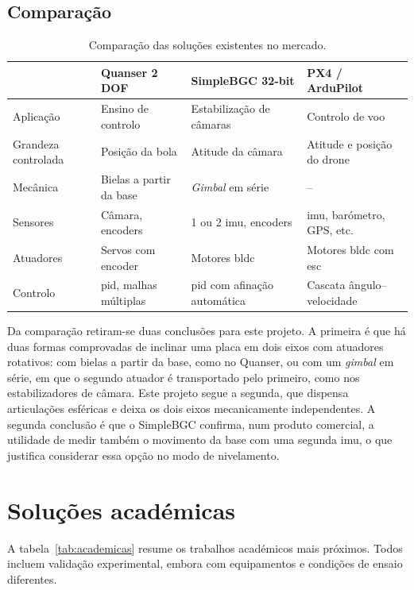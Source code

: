 \subsection{Comparação}
\begin{table}[H]
\centering\small
\caption{Comparação das soluções existentes no mercado.}
\begin{tabularx}{\textwidth}{>{\raggedright\arraybackslash}p{2.4cm}YYY}
\toprule
 & Quanser 2 DOF & SimpleBGC 32-bit & PX4 / ArduPilot\\\midrule
Aplicação & Ensino de controlo & Estabilização de câmaras & Controlo de voo\\
Grandeza controlada & Posição da bola & Atitude da câmara & Atitude e posição do drone\\
Mecânica & Bielas a partir da base & \textit{Gimbal} em série & --\\
Sensores & Câmara, encoders & 1 ou 2 \acrshort{imu}, encoders & \acrshort{imu}, barómetro, GPS, etc.\\
Atuadores & Servos com encoder & Motores \acrshort{bldc} & Motores \acrshort{bldc} com \acrshort{esc}\\
Controlo & \acrshort{pid}, malhas múltiplas & \acrshort{pid} com afinação automática & Cascata ângulo--velocidade\\
\bottomrule
\end{tabularx}
\label{tab:mercado}
\end{table}

Da comparação retiram-se duas conclusões para este projeto. A primeira é que há duas formas comprovadas de inclinar uma placa em dois eixos com atuadores rotativos: com bielas a partir da base, como no Quanser, ou com um \textit{gimbal} em série, em que o segundo atuador é transportado pelo primeiro, como nos estabilizadores de câmara. Este projeto segue a segunda, que dispensa articulações esféricas e deixa os dois eixos mecanicamente independentes. A segunda conclusão é que o SimpleBGC confirma, num produto comercial, a utilidade de medir também o movimento da base com uma segunda \gls{imu}, o que justifica considerar essa opção no modo de nivelamento.

\section{Soluções académicas}
A tabela~\ref{tab:academicas} resume os trabalhos académicos mais próximos. Todos incluem validação experimental, embora com equipamentos e condições de ensaio diferentes.


